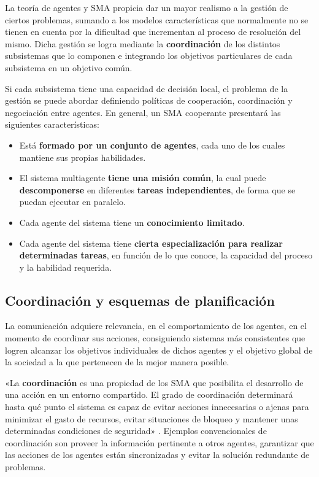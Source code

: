 La teoría de agentes y \acs{SMA} propicia dar un mayor realismo a la gestión de ciertos problemas, sumando a los modelos características que normalmente no se tienen en cuenta por la dificultad que incrementan al proceso de resolución del mismo. Dicha gestión se logra mediante la \textbf{coordinación} de los distintos subsistemas que lo componen e integrando los objetivos particulares de cada subsistema en un objetivo común.

Si cada subsistema tiene una capacidad de decisión local, el problema de la gestión se puede abordar definiendo políticas de cooperación, coordinación y negociación entre agentes. En general, un \acs{SMA} cooperante presentará las siguientes características:

\begin{itemize}
\item Está \textbf{formado por un conjunto de agentes}, cada uno de los cuales mantiene sus propias habilidades.
\item El sistema multiagente \textbf{tiene una misión común}, la cual puede \textbf{descomponerse} en diferentes \textbf{tareas independientes}, de forma que se puedan ejecutar en paralelo.
\item Cada agente del sistema tiene un \textbf{conocimiento limitado}.
\item Cada agente del sistema tiene \textbf{cierta especialización para realizar determinadas tareas}, en función de lo que conoce, la capacidad del proceso y la habilidad requerida.
\end{itemize}

\subsection{Coordinación y esquemas de planificación}
\label{sec:esquemascoordinacion}

La comunicación adquiere relevancia, en el comportamiento de los agentes, en el momento de coordinar sus acciones, consiguiendo sistemas más consistentes que logren alcanzar los objetivos individuales de dichos agentes y el objetivo global de la sociedad a la que pertenecen de la mejor manera posible.

«La \textbf{coordinación} es una propiedad de los \acs{SMA} que posibilita el desarrollo de una acción en un entorno compartido. El grado de coordinación determinará hasta qué punto el sistema es capaz de evitar acciones innecesarias o ajenas para minimizar el gasto de recursos, evitar situaciones de bloqueo y mantener unas determinadas condiciones de seguridad» \cite{coordinacion}. Ejemplos convencionales de coordinación son proveer la información pertinente a otros agentes, garantizar que las acciones de los agentes están sincronizadas y evitar la solución redundante de problemas.

